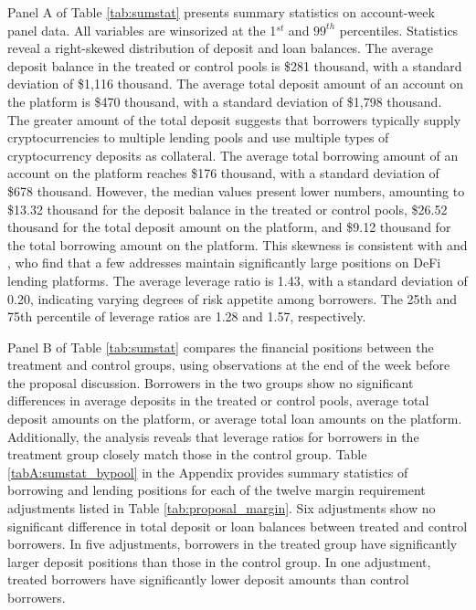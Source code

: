 \documentclass[12pt]{article}
\begin{document}
Panel A of Table \ref{tab:sumstat} presents summary statistics on account-week panel data. All variables are winsorized at the 1$^{st}$ and $99^{th}$ percentiles. Statistics reveal a right-skewed distribution of deposit and loan balances. The average deposit balance in the treated or control pools is \$281 thousand, with a standard deviation of \$1,116 thousand. The average total deposit amount of an account on the platform is \$470 thousand, with a standard deviation of \$1,798 thousand. The greater amount of the total deposit suggests that borrowers typically supply cryptocurrencies to multiple lending pools and use multiple types of cryptocurrency deposits as collateral. The average total borrowing amount of an account on the platform reaches \$176 thousand, with a standard deviation of \$678 thousand. However, the median values present lower numbers, amounting to \$13.32 thousand for the deposit balance in the treated or control pools, \$26.52 thousand for the total deposit amount on the platform, and \$9.12 thousand for the total borrowing amount on the platform. This skewness is consistent with \cite{mueller2023defi} and \cite{park2023phantom}, who find that a few addresses maintain significantly large positions on DeFi lending platforms. The average leverage ratio is 1.43, with a standard deviation of 0.20, indicating varying degrees of risk appetite among borrowers. The 25th and 75th percentile of leverage ratios are 1.28 and 1.57, respectively. 

Panel B of Table \ref{tab:sumstat} compares the financial positions between the treatment and control groups, using observations at the end of the week before the proposal discussion. Borrowers in the two groups show no significant differences in average deposits in the treated or control pools, average total deposit amounts on the platform, or average total loan amounts on the platform. Additionally, the analysis reveals that leverage ratios for borrowers in the treatment group closely match those in the control group. Table \ref{tabA:sumstat_bypool} in the Appendix provides summary statistics of borrowing and lending positions for each of the twelve margin requirement adjustments listed in Table \ref{tab:proposal_margin}. Six adjustments show no significant difference in total deposit or loan balances between treated and control borrowers. In five adjustments, borrowers in the treated group have significantly larger deposit positions than those in the control group. In one adjustment, treated borrowers have significantly lower deposit amounts than control borrowers.
\end{document}

